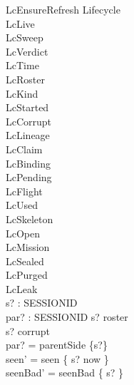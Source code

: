 \documentclass[a4paper,10pt,fleqn]{article}
\begin{document}
\begin{schema}{LcEnsureRefresh}
\Delta Lifecycle \\
\Xi LcLive \\
\Xi LcSweep \\
\Xi LcVerdict \\
\Xi LcTime \\
\Xi LcRoster \\
\Xi LcKind \\
\Xi LcStarted \\
\Xi LcCorrupt \\
\Xi LcLineage \\
\Xi LcClaim \\
\Xi LcBinding \\
\Xi LcPending \\
\Xi LcFlight \\
\Xi LcUsed \\
\Xi LcSkeleton \\
\Xi LcOpen \\
\Xi LcMission \\
\Xi LcSealed \\
\Xi LcPurged \\
\Xi LcLeak \\
s? : SESSIONID \\
par? : \power SESSIONID
\where
s? \in roster \\
s? \notin corrupt \\
par? = parentSide \limg \{s?\} \rimg \\
seen' = seen \oplus \{ s? \mapsto now \} \\
seenBad' = seenBad \setminus \{ s? \}
\end{schema}
\end{document}
